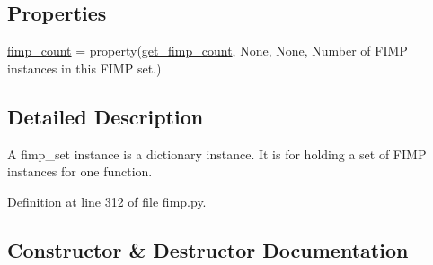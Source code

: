 \subsection*{Properties}
\begin{DoxyCompactItemize}
\item 
\hyperlink{classsylva_1_1base_1_1fimp_1_1fimp__set_a461b48d72f7fa42991d59c8ea4fd5593}{fimp\+\_\+count} = property(\hyperlink{classsylva_1_1base_1_1fimp_1_1fimp__set_aec3d350eabf8a4f0b7e478c4e27caf53}{get\+\_\+fimp\+\_\+count}, None, None, \textquotesingle{}Number of F\+I\+MP instances in this F\+I\+MP set.\textquotesingle{})
\end{DoxyCompactItemize}


\subsection{Detailed Description}
\begin{DoxyVerb}  A fimp_set instance is a dictionary instance.
  It is for holding a set of FIMP instances for one function.
\end{DoxyVerb}
 

Definition at line 312 of file fimp.\+py.



\subsection{Constructor \& Destructor Documentation}
\mbox{\label{classsylva_1_1base_1_1fimp_1_1fimp__set_ac9e5432efaba5bc24a3ad1ede9bfa670}} 
